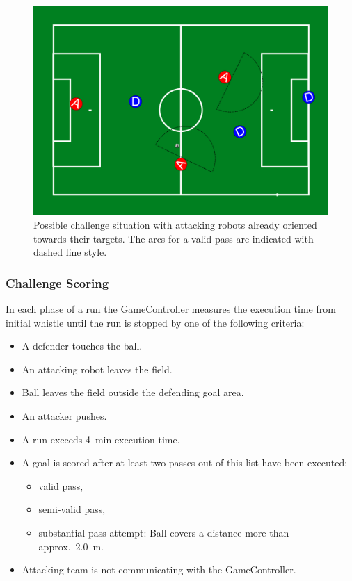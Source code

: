         \begin{figure}[ht!]
            \begin{center}
                \leavevmode
                \includegraphics[width=1\columnwidth]{figs/dbhc_arcs.png}
                \caption{Possible challenge situation with {\color{red} attacking robots} already oriented towards their targets. The arcs for a valid pass are indicated with dashed line style.}
                \label{fig:ball_handling_arc_positions}
            \end{center}
        \end{figure}

    \subsubsection{Challenge Scoring}

        In each phase of a run the GameController measures the execution time from initial whistle until the run is stopped by one of the following criteria:

        \begin{itemize}
            \item A defender touches the ball.
            \item An attacking robot leaves the field.
            \item Ball leaves the field outside the defending goal area.
            \item An attacker pushes.
            \item A run exceeds \qty{4}{\minute} execution time.
            \item A goal is scored after at least two passes out of this list have been executed:
            \begin{itemize}
                \item valid pass,
                \item semi-valid pass,
                \item substantial pass attempt: Ball covers a distance more than approx.~\qty{2.0}{\metre}.
            \end{itemize}
            \item Attacking team is not communicating with the GameController.
        \end{itemize}

